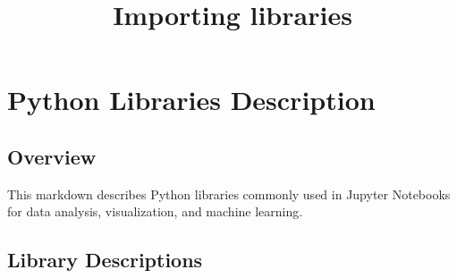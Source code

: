 \documentclass[
  letterpaper,
  DIV=11,
  numbers=noendperiod]{scrartcl}
\title{Importing libraries}
\author{}
\date{}
\begin{document}
\maketitle


\section{Python Libraries
Description}\label{python-libraries-description}

\subsection{Overview}\label{overview}

This markdown describes Python libraries commonly used in Jupyter
Notebooks for data analysis, visualization, and machine learning.

\subsection{Library Descriptions}\label{library-descriptions}
\end{document}
